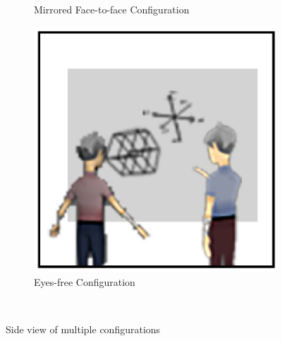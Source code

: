 \documentclass[chi_draft]{sigchi}
\begin{document}
\begin{figure}
\begin{subfigure}[b]{0.6\columnwidth}
        \caption{Mirrored Face-to-face Configuration}
    \end{subfigure}
    \begin{subfigure}[b]{0.6\columnwidth}
        \includegraphics[width=1\columnwidth]{teaser3.png}
        \caption{Eyes-free Configuration}
    \end{subfigure}
  \caption{Side view of multiple configurations}~\label{fig:teaser}
\end{figure}
\end{document}
